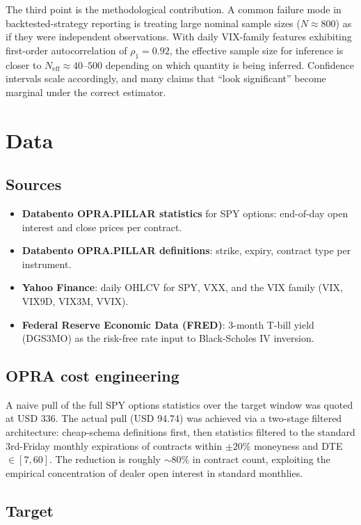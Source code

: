 \documentclass[11pt,a4paper]{article}
\begin{document}
The third point is the methodological contribution. A common failure mode in backtested-strategy reporting is treating large nominal sample sizes ($N \approx 800$) as if they were independent observations. With daily VIX-family features exhibiting first-order autocorrelation of $\rho_1 = 0.92$, the effective sample size for inference is closer to $N_{\text{eff}} \approx 40$--$500$ depending on which quantity is being inferred. Confidence intervals scale accordingly, and many claims that ``look significant'' become marginal under the correct estimator.

\section{Data}

\subsection{Sources}

\begin{itemize}
    \item \textbf{Databento OPRA.PILLAR statistics} for SPY options: end-of-day open interest and close prices per contract.
    \item \textbf{Databento OPRA.PILLAR definitions}: strike, expiry, contract type per instrument.
    \item \textbf{Yahoo Finance}: daily OHLCV for SPY, VXX, and the VIX family (VIX, VIX9D, VIX3M, VVIX).
    \item \textbf{Federal Reserve Economic Data (FRED)}: 3-month T-bill yield (DGS3MO) as the risk-free rate input to Black-Scholes IV inversion.
\end{itemize}

\subsection{OPRA cost engineering}

A naive pull of the full SPY options statistics over the target window was quoted at USD 336. The actual pull (USD 94.74) was achieved via a two-stage filtered architecture: cheap-schema definitions first, then statistics filtered to the standard 3rd-Friday monthly expirations of contracts within $\pm 20\%$ moneyness and DTE $\in [7, 60]$. The reduction is roughly $\sim 80\%$ in contract count, exploiting the empirical concentration of dealer open interest in standard monthlies.

\subsection{Target}
\end{document}
